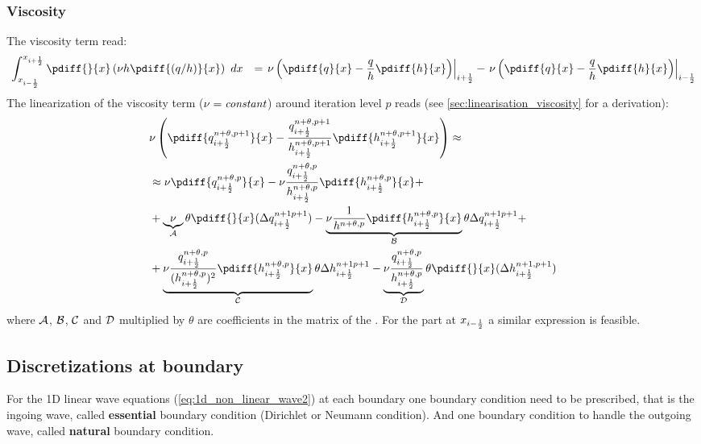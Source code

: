 \subsubsection{Viscosity}
The viscosity term read:
\begin{align}
    &  \int^{x_{i+\half}}_{x_{i-\half}} \pdiff{}{x} \left( \nu h \pdiff{(q/h)}{x} \right)\ dx & =
    \left. \nu \left( \pdiff{q}{x} - \frac{q}{h} \pdiff{h}{x} \right) \right|_{i+\half} - \left. \nu \left( \pdiff{q}{x} - \frac{q}{h} \pdiff{h}{x} \right) \right|_{i-\half}
\end{align}
The linearization of the viscosity term ($\nu = {\it constant}$) around iteration level $p$ reads (see \autoref{sec:linearisation_viscosity} for a derivation):
\begin{align}
    &\nu \left(\pdiff{q^{n+\theta, p+1}_{i+\half}}{x} - \frac{q^{n+\theta, p+1}_{i+\half}}{h^{n+\theta, p+1}_{i+\half}} \pdiff{h^{n+\theta, p+1}_{i+\half}}{x} \right) \approx
    \\
    & \approx \nu  \pdiff{q^{n+\theta, p}_{i+\half}}{x}   -  \nu \frac{q^{n+\theta, p}_{i+\half}}{h^{n+\theta, p}_{i+\half}} \pdiff{h^{n+\theta, p}_{i+\half}}{x}  +
    \nonumber \\
    & + \underbrace{\nu}_{\cal{A}}\theta \pdiff{}{x}( \Delta q^{n+1 p+1}_{i+\half})
    -  \underbrace{\nu \frac{1}{h^{n+\theta, p}}\pdiff{h^{n+\theta, p}_{i+\half}}{x}}_{\cal{B}} \theta\Delta q^{n+1 p+1}_{i+\half}  +
    \nonumber \\
    & +  \underbrace{\nu \frac{q^{n+\theta, p}_{i+\half}}{(h^{n+\theta, p}_{i+\half})^2} \pdiff{h^{n+\theta, p}_{i+\half}}{x}}_{\cal{C}} \theta\Delta h^{n+1 p+1}_{i+\half}
    - \underbrace{\nu \frac{q^{n+\theta, p}_{i+\half}}{h^{n+\theta, p}_{i+\half}}}_{\cal{D}} \theta \pdiff{}{x}( \Delta h^{n+1, p+1}_{i+\half})
\end{align}
where $\cal{A}$, $\cal{B}$, $\cal{C}$ and $\cal{D}$ multiplied by $\theta$ are coefficients in the matrix of the \deltaformulation.
For the part at $x_{i-\frac{1}{2}}$ a similar expression is feasible.

\subsection{Discretizations at boundary}
For the 1D linear wave equations (\autoref{eq:1d_non_linear_wave2}) at each boundary one boundary condition need to be prescribed, that is the ingoing wave, called \textbf{essential} boundary condition (Dirichlet or Neumann condition).
And one boundary condition to handle the outgoing wave, called \textbf{natural} boundary condition.


